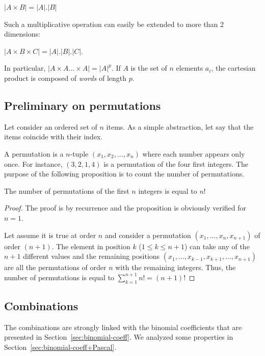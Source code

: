\begin{itemize}
$|A \times B| = |A|.|B|$

Such a multiplicative operation can easily be extended to more than 2 dimensions: 

$|A \times B \times C| = |A|.|B|.|C|$.

In particular, $|A \times A ... \times A| = |A|^p$.
If $A$ is the set of $n$ elements $a_i$,
the cartesian product is composed of \textit{words} of length $p$.
\end{itemize}


\subsection{Preliminary on permutations}

Let consider an ordered set of $n$ items. 
As a simple abstraction, let say that the items coincide with their index.

A permutation is a $n$-tuple $(x_1,x_2, \ldots , x_n)$ where each number appears only once. 
For instance, 
$(3,2,1,4)$ is a permutation of the four first integers. 
The purpose of the following proposition is to count the number of permutations.
\bigskip

\begin{prop}
The number of permutations of the first $n$ integers is equal to $n!$
\end{prop}

\begin{proof}
The proof is by recurrence and the proposition is obviously verified for $n=1$.

Let assume it is true at order $n$ and consider a permutation $(x_1, \ldots , x_n, x_{n+1})$ of order $(n+1)$.
The element in position $k$ ($1 \leq k \leq n+1$) can take any of the $n+1$ different values
and the remaining positions $(x_1, \ldots , x_{k-1}, x_{k+1}, \ldots, x_{n+1})$
are all the permutations of order $n$ with the remaining integers.
Thus, the number of permutations is equal to $\sum_{k=1}^{n+1} n! = (n+1)!$
\end{proof}



\subsection{Combinations}

The combinations are strongly linked with the binomial coefficients that are presented 
in Section~\ref{sec:binomial-coeff}.
We analyzed some properties in Section~\ref{sec:binomial-coeff+Pascal}.

